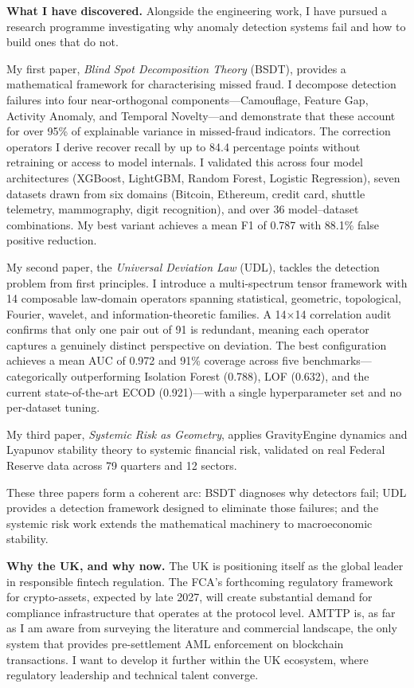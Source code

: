 \documentclass[12pt,a4paper]{article}
\begin{document}
\textbf{What I have discovered.}
Alongside the engineering work, I have pursued a research programme investigating why anomaly detection systems fail and how to build ones that do not.

My first paper, \textit{Blind Spot Decomposition Theory} (BSDT), provides a mathematical framework for characterising missed fraud. I decompose detection failures into four near-orthogonal components---Camouflage, Feature Gap, Activity Anomaly, and Temporal Novelty---and demonstrate that these account for over 95\% of explainable variance in missed-fraud indicators. The correction operators I derive recover recall by up to 84.4 percentage points without retraining or access to model internals. I validated this across four model architectures (XGBoost, LightGBM, Random Forest, Logistic Regression), seven datasets drawn from six domains (Bitcoin, Ethereum, credit card, shuttle telemetry, mammography, digit recognition), and over 36 model--dataset combinations. My best variant achieves a mean F1 of 0.787 with 88.1\% false positive reduction.

My second paper, the \textit{Universal Deviation Law} (UDL), tackles the detection problem from first principles. I introduce a multi-spectrum tensor framework with 14 composable law-domain operators spanning statistical, geometric, topological, Fourier, wavelet, and information-theoretic families. A 14$\times$14 correlation audit confirms that only one pair out of 91 is redundant, meaning each operator captures a genuinely distinct perspective on deviation. The best configuration achieves a mean AUC of 0.972 and 91\% coverage across five benchmarks---categorically outperforming Isolation Forest (0.788), LOF (0.632), and the current state-of-the-art ECOD (0.921)---with a single hyperparameter set and no per-dataset tuning.

My third paper, \textit{Systemic Risk as Geometry}, applies GravityEngine dynamics and Lyapunov stability theory to systemic financial risk, validated on real Federal Reserve data across 79 quarters and 12 sectors.

These three papers form a coherent arc: BSDT diagnoses why detectors fail; UDL provides a detection framework designed to eliminate those failures; and the systemic risk work extends the mathematical machinery to macroeconomic stability.

\textbf{Why the UK, and why now.}
The UK is positioning itself as the global leader in responsible fintech regulation. The FCA's forthcoming regulatory framework for crypto-assets, expected by late 2027, will create substantial demand for compliance infrastructure that operates at the protocol level. AMTTP is, as far as I am aware from surveying the literature and commercial landscape, the only system that provides pre-settlement AML enforcement on blockchain transactions. I want to develop it further within the UK ecosystem, where regulatory leadership and technical talent converge.
\end{document}
